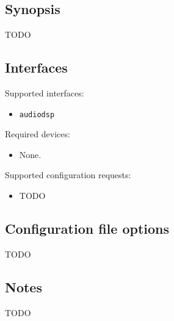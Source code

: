 
\subsection*{Synopsis}

TODO

\subsection*{Interfaces}

\noindent Supported interfaces:

\begin{itemize}
\item {\tt audiodsp}
\end{itemize}

\noindent Required devices:
\begin{itemize}
\item None.
\end{itemize}

\noindent Supported configuration requests:
\begin{itemize}
\item TODO
\end{itemize}


\subsection*{Configuration file options}

TODO

\subsection*{Notes}

TODO
